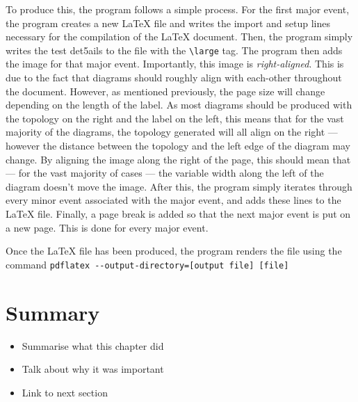 To produce this, the program follows a simple process.
For the first major event, the program creates a new LaTeX file and writes the import and setup lines necessary for the compilation of the LaTeX document.
Then, the program simply writes the test det5ails to the file with the \verb|\large| tag.
The program then adds the image for that major event. Importantly, this image is \emph{right-aligned}. 
This is due to the fact that diagrams should roughly align with each-other throughout the document.
However, as mentioned previously, the page size will change depending on the length of the label.
As most diagrams should be produced with the topology on the right and the label on the left, this means that for the vast majority of the diagrams, the topology generated will all align on the right — however the distance between the topology and the left edge of the diagram may change.
By aligning the image along the right of the page, this should mean that — for the vast majority of cases — the variable width along the left of the diagram doesn't move the image.
After this, the program simply iterates through every minor event associated with the major event, and adds these lines to the LaTeX file.
Finally, a page break is added so that the next major event is put on a new page.
This is done for every major event.

Once the LaTeX file has been produced, the program renders the file using the command
\verb|pdflatex --output-directory=[output file] [file]|


\section{Summary}
\begin{itemize}
    \item Summarise what this chapter did
    \item Talk about why it was important
    \item Link to next section
\end{itemize}